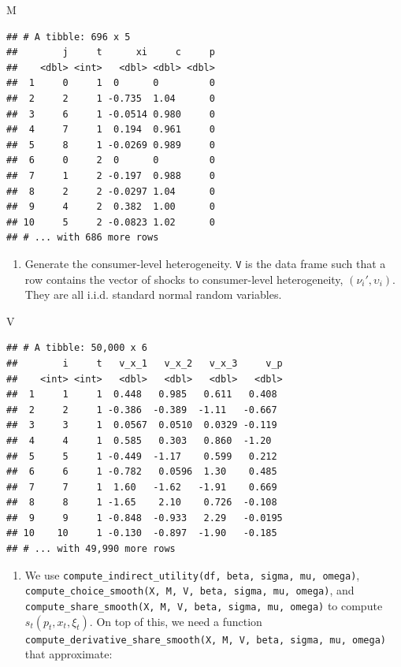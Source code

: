 \documentclass[
]{book}
\newenvironment{Shaded}{\begin{snugshade}}{\end{snugshade}}
\newcommand{\NormalTok}[1]{#1}
\providecommand{\tightlist}{%
  \setlength{\itemsep}{0pt}\setlength{\parskip}{0pt}}
\begin{document}
\begin{Shaded}
\begin{Highlighting}[]
\NormalTok{M}
\end{Highlighting}
\end{Shaded}

\begin{verbatim}
## # A tibble: 696 x 5
##        j     t      xi     c     p
##    <dbl> <int>   <dbl> <dbl> <dbl>
##  1     0     1  0      0         0
##  2     2     1 -0.735  1.04      0
##  3     6     1 -0.0514 0.980     0
##  4     7     1  0.194  0.961     0
##  5     8     1 -0.0269 0.989     0
##  6     0     2  0      0         0
##  7     1     2 -0.197  0.988     0
##  8     2     2 -0.0297 1.04      0
##  9     4     2  0.382  1.00      0
## 10     5     2 -0.0823 1.02      0
## # ... with 686 more rows
\end{verbatim}

\begin{enumerate}
\def\labelenumi{\arabic{enumi}.}
\setcounter{enumi}{3}
\tightlist
\item
  Generate the consumer-level heterogeneity. \texttt{V} is the data frame such that a row contains the vector of shocks to consumer-level heterogeneity, \((\nu_{i}', \upsilon_i)\). They are all i.i.d. standard normal random variables.
\end{enumerate}

\begin{Shaded}
\begin{Highlighting}[]
\NormalTok{V}
\end{Highlighting}
\end{Shaded}

\begin{verbatim}
## # A tibble: 50,000 x 6
##        i     t   v_x_1   v_x_2   v_x_3     v_p
##    <int> <int>   <dbl>   <dbl>   <dbl>   <dbl>
##  1     1     1  0.448   0.985   0.611   0.408 
##  2     2     1 -0.386  -0.389  -1.11   -0.667 
##  3     3     1  0.0567  0.0510  0.0329 -0.119 
##  4     4     1  0.585   0.303   0.860  -1.20  
##  5     5     1 -0.449  -1.17    0.599   0.212 
##  6     6     1 -0.782   0.0596  1.30    0.485 
##  7     7     1  1.60   -1.62   -1.91    0.669 
##  8     8     1 -1.65    2.10    0.726  -0.108 
##  9     9     1 -0.848  -0.933   2.29   -0.0195
## 10    10     1 -0.130  -0.897  -1.90   -0.185 
## # ... with 49,990 more rows
\end{verbatim}

\begin{enumerate}
\def\labelenumi{\arabic{enumi}.}
\setcounter{enumi}{4}
\tightlist
\item
  We use \texttt{compute\_indirect\_utility(df,\ beta,\ sigma,\ mu,\ omega)}, \texttt{compute\_choice\_smooth(X,\ M,\ V,\ beta,\ sigma,\ mu,\ omega)}, and \texttt{compute\_share\_smooth(X,\ M,\ V,\ beta,\ sigma,\ mu,\ omega)} to compute \(s_t(p_t, x_t, \xi_t)\). On top of this, we need a function \texttt{compute\_derivative\_share\_smooth(X,\ M,\ V,\ beta,\ sigma,\ mu,\ omega)} that approximate:
\end{enumerate}
\end{document}
